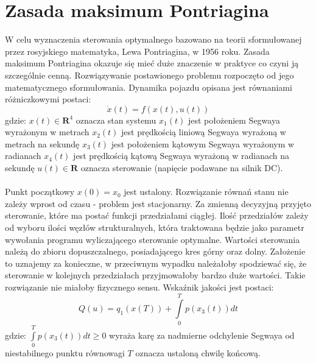 \section{Zasada maksimum Pontriagina}
\label{sec:zasada_max}

W celu wyznaczenia sterowania optymalnego bazowano na teorii sformułowanej przez rosyjskiego matematyka, Lewa Pontriagina, w 1956 roku. Zasada maksimum Pontriagina okazuje się mieć duże znaczenie w praktyce co czyni ją szczególnie cenną. Rozwiązywanie postawionego problemu rozpoczęto od jego matematycznego sformułowania. Dynamika pojazdu opisana jest równaniami różniczkowymi postaci:
\begin{equation}
\dot{x}(t)=f(x(t),u(t))
\end{equation}
\noindent gdzie:\newline
$x(t)\in\textbf{R}^{4}$ oznacza stan systemu\newline
$x_1(t)$ jest położeniem Segwaya wyrażonym w metrach\newline
$x_2(t)$ jest prędkością liniową Segwaya wyrażoną w metrach na sekundę\newline
$x_3(t)$ jest położeniem kątowym Segwaya wyrażonym w radianach\newline
$x_4(t)$ jest prędkością kątową Segwaya wyrażoną w radianach na sekundę\newline
$u(t)\in\textbf{R}$ oznacza sterowanie (napięcie podawane na silnik DC).\newline
\paragraph*{}
Punkt początkowy $x(0)=x_0$ jest ustalony. Rozwiązanie równań stanu nie zależy wprost od czasu - problem jest stacjonarny. Za zmienną decyzyjną przyjęto sterowanie, które ma postać funkcji przedziałami ciągłej. Ilość przedziałów zależy od wyboru ilości węzłów strukturalnych, która traktowana będzie jako parametr wywołania programu wyliczającego sterowanie optymalne. Wartości sterowania należą do zbioru dopuszczalnego, posiadającego kres górny oraz dolny. Założenie to uznajemy za konieczne, w przeciwnym wypadku należałoby spodziewać się, że sterowanie w kolejnych przedziałach przyjmowałoby bardzo duże wartości. Takie rozwiązanie nie miałoby fizycznego sensu. Wskaźnik jakości jest postaci:
\begin{equation}
Q(u)=q_1(x(T))+\int\limits_{0}^{T}p(x_3(t))dt
\end{equation}
\noindent gdzie:\newline
\(\int\limits_{0}^{T}p(x_3(t))dt\geq0\) wyraża karę za nadmierne odchylenie Segwaya od niestabilnego punktu równowagi\newline
\(T\) oznacza ustaloną chwilę końcową.
